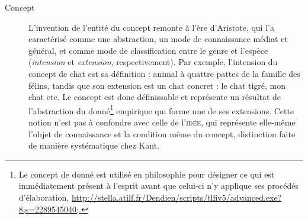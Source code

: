 \begin{description}
\item[Concept] L'invention de l'entité du concept remonte à l'ère d'Aristote, qui l'a caractérisé comme une abstraction, un mode de connaissance médiat et général, et comme mode de classification entre le genre et l'espèce (\textit{intension} et \textit{extension}, respectivement). Par exemple, l'intension du concept de chat est sa définition : \og{}animal à quattre pattes de la famille des félins\fg{}, tandis que son extension est un chat concret : le chat tigré, mon chat etc. Le concept est donc définissable et représente un résultat de l'abstraction du donné\footnote{Le concept de \og{}donné\fg{} est utilisé en philosophie pour désigner \og{}ce qui est immédiatement présent à l'esprit avant que celui-ci n'y applique ses procédés d'élaboration\fg{}, \url{http://stella.atilf.fr/Dendien/scripts/tlfiv5/advanced.exe?8;s=2289545040;.}} empirique qui forme une de ses extensions. Cette notion n'est pas à confondre avec celle de l'\textsc{idée}, qui représente elle-même l'objet de connaissance et la condition même du concept, distinction faite de manière systématique chez Kant.


\end{description}
